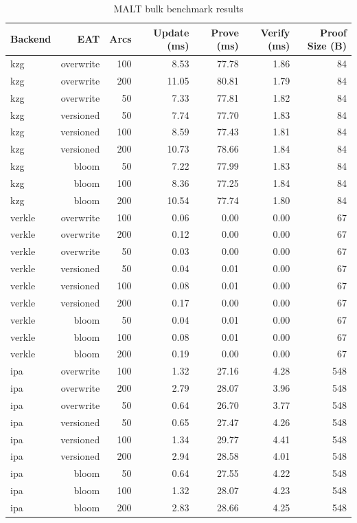 \begin{table}[htbp]
\centering
\caption{MALT bulk benchmark results}
\label{tab:bulk}
\begin{tabular}{lrrrrrr}
\toprule
Backend & EAT & Arcs & Update (ms) & Prove (ms) & Verify (ms) & Proof Size (B) \\
\midrule
kzg & overwrite & 100 & 8.53 & 77.78 & 1.86 & 84 \\
kzg & overwrite & 200 & 11.05 & 80.81 & 1.79 & 84 \\
kzg & overwrite & 50 & 7.33 & 77.81 & 1.82 & 84 \\
kzg & versioned & 50 & 7.74 & 77.70 & 1.83 & 84 \\
kzg & versioned & 100 & 8.59 & 77.43 & 1.81 & 84 \\
kzg & versioned & 200 & 10.73 & 78.66 & 1.84 & 84 \\
kzg & bloom & 50 & 7.22 & 77.99 & 1.83 & 84 \\
kzg & bloom & 100 & 8.36 & 77.25 & 1.84 & 84 \\
kzg & bloom & 200 & 10.54 & 77.74 & 1.80 & 84 \\
verkle & overwrite & 100 & 0.06 & 0.00 & 0.00 & 67 \\
verkle & overwrite & 200 & 0.12 & 0.00 & 0.00 & 67 \\
verkle & overwrite & 50 & 0.03 & 0.00 & 0.00 & 67 \\
verkle & versioned & 50 & 0.04 & 0.01 & 0.00 & 67 \\
verkle & versioned & 100 & 0.08 & 0.01 & 0.00 & 67 \\
verkle & versioned & 200 & 0.17 & 0.00 & 0.00 & 67 \\
verkle & bloom & 50 & 0.04 & 0.01 & 0.00 & 67 \\
verkle & bloom & 100 & 0.08 & 0.01 & 0.00 & 67 \\
verkle & bloom & 200 & 0.19 & 0.00 & 0.00 & 67 \\
ipa & overwrite & 100 & 1.32 & 27.16 & 4.28 & 548 \\
ipa & overwrite & 200 & 2.79 & 28.07 & 3.96 & 548 \\
ipa & overwrite & 50 & 0.64 & 26.70 & 3.77 & 548 \\
ipa & versioned & 50 & 0.65 & 27.47 & 4.26 & 548 \\
ipa & versioned & 100 & 1.34 & 29.77 & 4.41 & 548 \\
ipa & versioned & 200 & 2.94 & 28.58 & 4.01 & 548 \\
ipa & bloom & 50 & 0.64 & 27.55 & 4.22 & 548 \\
ipa & bloom & 100 & 1.32 & 28.07 & 4.23 & 548 \\
ipa & bloom & 200 & 2.83 & 28.66 & 4.25 & 548 \\
\bottomrule
\end{tabular}
\end{table}
